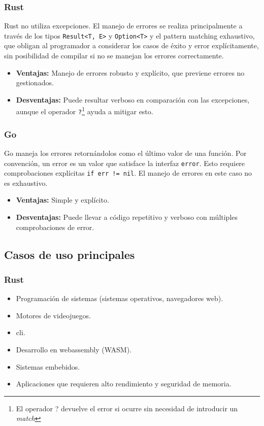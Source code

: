 \subsubsection{Rust}
Rust no utiliza excepciones. El manejo de errores se realiza principalmente a través de los tipos \texttt{Result<T, E>} y \texttt{Option<T>} y el pattern matching exhaustivo, que obligan al programador a considerar los casos de éxito y error explícitamente, sin posibilidad de compilar si no se manejan los errores correctamente.
\begin{itemize}
    \item \textbf{Ventajas:} Manejo de errores robusto y explícito, que previene errores no gestionados.
    \item \textbf{Desventajas:} Puede resultar verboso en comparación con las excepciones, aunque el operador \texttt{?}\footnote{El operador ? devuelve el error si ocurre sin necesidad de introducir un \textit{match}} ayuda a mitigar esto.
\end{itemize}

\subsubsection{Go}
Go maneja los errores retornándolos como el último valor de una función. Por convención, un error es un valor que satisface la interfaz \texttt{error}. Esto requiere comprobaciones explícitas \texttt{if err != nil}.
El manejo de errores en este caso no es exhaustivo.
\begin{itemize}
    \item \textbf{Ventajas:} Simple y explícito.
    \item \textbf{Desventajas:} Puede llevar a código repetitivo y verboso con múltiples comprobaciones de error.
\end{itemize}

\subsection{Casos de uso principales}
\subsubsection{Rust}

\begin{itemize}
    \item Programación de sistemas (sistemas operativos, navegadores web).
    \item Motores de videojuegos.
    \item \acrfull{cli}.
    \item Desarrollo en \gls{webassembly} (WASM).
    \item Sistemas embebidos.
    \item Aplicaciones que requieren alto rendimiento y seguridad de memoria.
\end{itemize}

